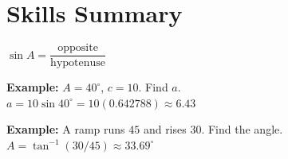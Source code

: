 \documentclass[12pt]{article}
\newcommand{\ans}[1]{\boldsymbol{#1}}
\begin{document}
\section*{Skills Summary}

\begin{formulabox}
$\sin A = \dfrac{\text{opposite}}{\text{hypotenuse}}$
\end{formulabox}

\begin{examplebox}
\textbf{Example:} $A = 40^\circ$, $c = 10$. Find $a$.\\
$a = 10\sin 40^\circ = 10(0.642788) \approx \ans{6.43}$
\end{examplebox}

\begin{examplebox}
\textbf{Example:} A ramp runs $45$ and rises $30$. Find the angle.\\
$A = \tan^{-1}(30/45) \approx \ans{33.69^\circ}$
\end{examplebox}
\end{document}
